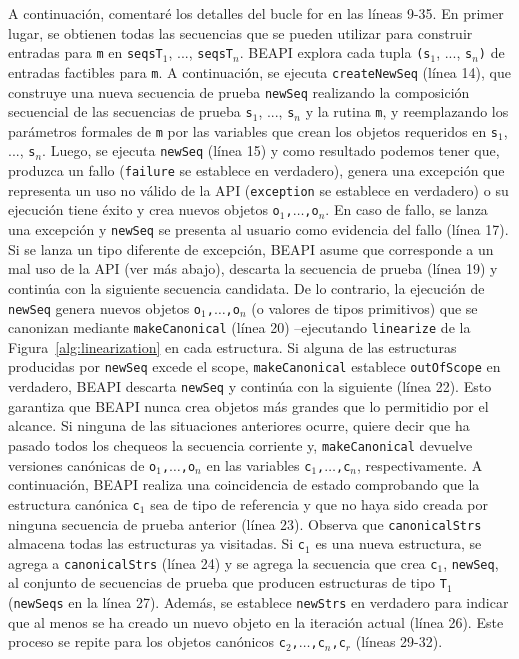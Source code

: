 A continuación, comentaré los detalles del bucle for en las líneas 9-35. En primer lugar, se obtienen todas las secuencias que se pueden utilizar para construir entradas para \texttt{m} en \texttt{seqsT$_1$}, ..., \texttt{seqsT$_n$}. \textsf{BEAPI} explora cada tupla \texttt{(s$_1$}, ..., \texttt{s$_n$)} de entradas factibles para \texttt{m}. A continuación, se ejecuta \texttt{createNewSeq} (línea 14), que construye una nueva secuencia de prueba \texttt{newSeq} realizando la composición secuencial de las secuencias de prueba \texttt{s$_1$}, ..., \texttt{s$_n$} y la rutina \texttt{m}, y reemplazando los parámetros formales de \texttt{m} por las variables que crean los objetos requeridos en \texttt{s$_1$}, ..., \texttt{s$_n$}. Luego, se ejecuta \texttt{newSeq} (línea 15) y como resultado podemos tener que, produzca un fallo (\texttt{failure} se establece en verdadero), genera una excepción que representa un uso no válido de la API (\texttt{exception} se establece en verdadero) o su ejecución tiene éxito y crea nuevos objetos \texttt{o$_1$,$\ldots$,o$_n$}. En caso de fallo, se lanza una excepción y \texttt{newSeq} se presenta al usuario como evidencia del fallo (línea 17). Si se lanza un tipo diferente de excepción, \textsf{BEAPI} asume que corresponde a un mal uso de la API (ver más abajo), descarta la secuencia de prueba (línea 19) y continúa con la siguiente secuencia candidata. De lo contrario, la ejecución de \texttt{newSeq} genera nuevos objetos \texttt{o$_1$,$\ldots$,o$_n$} (o valores de tipos primitivos) que se canonizan mediante \texttt{makeCanonical} (línea 20) --ejecutando \texttt{linearize} de la Figura~\ref{alg:linearization} en cada estructura. Si alguna de las estructuras producidas por \texttt{newSeq} excede el scope, \texttt{makeCanonical} establece \texttt{outOfScope} en verdadero, \textsf{BEAPI} descarta \texttt{newSeq} y continúa con la siguiente (línea 22).
Esto garantiza que \textsf{BEAPI} nunca crea objetos más grandes que lo permitidio por el alcance.
Si ninguna de las situaciones anteriores ocurre, quiere decir que ha pasado todos los chequeos la secuencia corriente y, \texttt{makeCanonical} devuelve versiones canónicas de \texttt{o$_1$,$\ldots$,o$_n$} en las variables \texttt{c$_1$,$\ldots$,c$_n$}, respectivamente. A continuación, \textsf{BEAPI} realiza una coincidencia de estado comprobando que la estructura canónica \texttt{c$_1$} sea de tipo de referencia y que no haya sido creada por ninguna secuencia de prueba anterior (línea 23). Observa que \texttt{canonicalStrs} almacena todas las estructuras ya visitadas. Si \texttt{c$_1$} es una nueva estructura, se agrega a \texttt{canonicalStrs} (línea 24) y se agrega la secuencia que crea \texttt{c$_1$}, \texttt{newSeq}, al conjunto de secuencias de prueba que producen estructuras de tipo \texttt{T$_1$} (\texttt{newSeqs} en la línea 27). Además, se establece \texttt{newStrs} en verdadero para indicar que al menos se ha creado un nuevo objeto en la iteración actual (línea 26). Este proceso se repite para los objetos canónicos \texttt{c$_2$,$\ldots$,c$_n$,c$_r$} (líneas 29-32).

